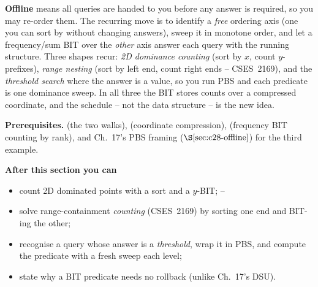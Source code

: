 \begin{topicintro}
\textbf{Offline} means all queries are handed to you before any answer is
required, so you may re-order them.  The recurring move is to identify a
\emph{free} ordering axis (one you can sort by without changing answers), sweep
it in monotone order, and let a frequency/sum BIT over the \emph{other} axis
answer each query with the running structure.  Three shapes recur:
\emph{2D dominance counting} (sort by \(x\), count \(y\)-prefixes), \emph{range
nesting} (sort by left end, count right ends -- CSES~2169), and the
\emph{threshold search} where the answer is a value, so you run PBS and each
predicate is one dominance sweep.  In all three the BIT stores counts over a
compressed coordinate, and the schedule -- not the data structure -- is the new
idea.

\textbf{Prerequisites.}  (the two walks), 
(coordinate compression),  (frequency BIT counting by rank),
and Ch.~17's PBS framing (\(\secref{c28-offline}\)) for the third example.

\textbf{After this section you can}
\begin{itemize}[nosep]
  \item count 2D dominated points with a sort and a \(y\)-BIT; \hfill{}--
  \item solve range-containment \emph{counting} (CSES~2169) by sorting one end
        and BIT-ing the other; \hfill{}
  \item recognise a query whose answer is a \emph{threshold}, wrap it in PBS,
        and compute the predicate with a fresh sweep each level; \hfill{}
  \item state why a BIT predicate needs no rollback (unlike Ch.~17's DSU). \hfill{}
\end{itemize}
\end{topicintro}

